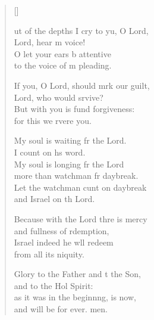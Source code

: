 \settowidth{\versewidth}{Out of the depths I cry to you, O Lord, *}
\begin{verse}[\versewidth]
  \begin{patverse}
ut of the depths I cry to yu, O Lord,\Med\\
    Lord, hear m voice!\\
O let your ears b attentive\Med\\
    to the voice of m pleading.

If you, O Lord, should mrk our guilt,\Med\\
    Lord, who would srvive?\\
But with you is fund forgiveness:\Med\\
    for this we rvere you.

My soul is waiting fr the Lord.\Med\\
    I count on h\pointup{\i}s word.\\
My soul is longing fr the Lord\Med\\
    more than watchman fr daybreak.\\
Let the watchman cunt on daybreak\Med\\
    and Israel on th Lord.

Because with the Lord thre is mercy\Med\\
    and fullness of rdemption,\\
Israel indeed he w\pointup{\i}ll redeem\Med\\
    from all its \pointup{\i}niquity.

Glory to the Father and t the Son,\Med\\
    and to the Hol Spirit:\\
as it was in the beginn\pointup{\i}ng, is now,\Med\\
    and will be for ever. men.
  \end{patverse}
\end{verse}
